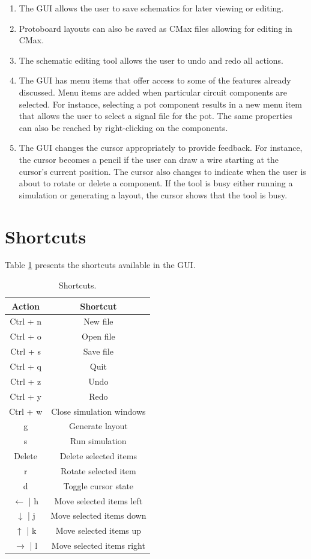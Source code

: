 \begin{enumerate}
\item The GUI allows the user to save schematics for later viewing or editing.
\item Protoboard layouts can also be saved as CMax files allowing for editing
in CMax.
\item The schematic editing tool allows the user to undo and redo all actions.
\item The GUI has menu items that offer access to some of the features already
discussed. Menu items are added when particular circuit components are selected.
For instance, selecting a pot component results in a new menu item that allows
the user to select a signal file for the pot. The same properties can also be
reached by right-clicking on the components.
\item The GUI changes the cursor appropriately to provide feedback. For instance,
the cursor becomes
a pencil if the user can draw a wire starting at the cursor's current position.
The cursor also changes to indicate when the user is about to rotate or delete
a component. If the tool is busy either running a simulation or generating a
layout, the cursor shows that the tool is busy.
\end{enumerate}

\section{Shortcuts}
Table \ref{tb:shortcuts} presents the shortcuts available in the GUI.

\begin{table}
\begin{center}
\begin{singlespace}
\begin{tabular}{| c | c |}
\hline
Action & Shortcut \\
\hline
\hline
Ctrl + n & New file \\
Ctrl + o & Open file \\
Ctrl + s & Save file \\
Ctrl + q & Quit \\
Ctrl + z & Undo \\
Ctrl + y & Redo \\
Ctrl + w & Close simulation windows \\
g & Generate layout \\
s & Run simulation \\
Delete & Delete selected items \\
r & Rotate selected item \\
d & Toggle cursor state \\
$\leftarrow$ | h & Move selected items left \\
$\downarrow$ | j & Move selected items down \\
$\uparrow$ | k & Move selected items up \\
$\rightarrow$ | l & Move selected items right \\
\hline
\end{tabular}
\end{singlespace}
\end{center}
\label{tb:shortcuts}
\caption{Shortcuts.}
\end{table}
